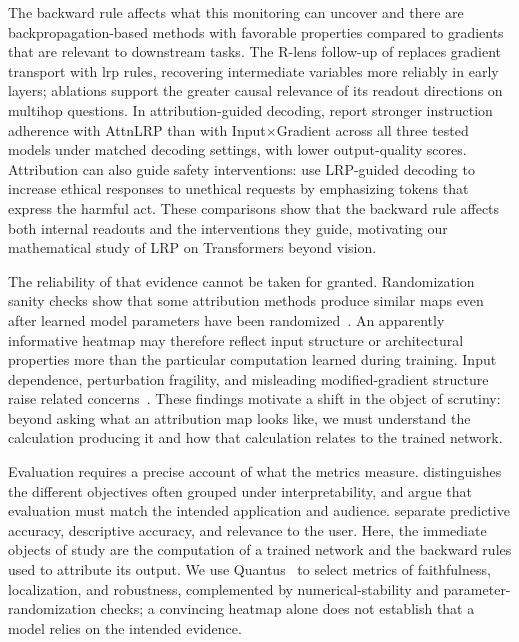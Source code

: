 The backward rule affects what this monitoring can uncover and there are backpropagation-based methods with favorable properties compared to gradients that are relevant to downstream tasks. The R-lens follow-up of \textcite{Blank2026RLens} replaces gradient transport with \ac{lrp} rules, recovering intermediate variables more reliably in early layers; ablations support the greater causal relevance of its readout directions on multihop questions. In attribution-guided decoding, \textcite{Komorowski2026AGD} report stronger instruction adherence with AttnLRP than with Input$\times$Gradient across all three tested models under matched decoding settings, with lower output-quality scores. Attribution can also guide safety interventions: \textcite{Biton2026HiddenRequest} use LRP-guided decoding to increase ethical responses to unethical requests by emphasizing tokens that express the harmful act. These comparisons show that the backward rule affects both internal readouts and the interventions they guide, motivating our mathematical study of LRP on Transformers beyond vision.

The reliability of that evidence cannot be taken for granted. Randomization sanity checks show that some attribution methods produce similar maps even after learned model parameters have been randomized~\parencite{Adebayo2018sanity}. An apparently informative heatmap may therefore reflect input structure or architectural properties more than the particular computation learned during training. Input dependence, perturbation fragility, and misleading modified-gradient structure raise related concerns~\parencite{Kindermans2018PatternAttribution,Ghorbani2019fragile,Nie2018guided,sixt2020whenexplanationslie}. These findings motivate a shift in the object of scrutiny: beyond asking what an attribution map looks like, we must understand the calculation producing it and how that calculation relates to the trained network.

Evaluation requires a precise account of what the metrics measure. \textcite{Lipton2018Mythos} distinguishes the different objectives often grouped under interpretability, and \textcite{DoshiVelezKim2017} argue that evaluation must match the intended application and audience. \textcite{Murdoch2019Interpretability} separate predictive accuracy, descriptive accuracy, and relevance to the user. Here, the immediate objects of study are the computation of a trained network and the backward rules used to attribute its output. We use Quantus~\parencite{Hedstrom2023} to select metrics of faithfulness, localization, and robustness, complemented by numerical-stability and parameter-randomization checks; a convincing heatmap alone does not establish that a model relies on the intended evidence.

